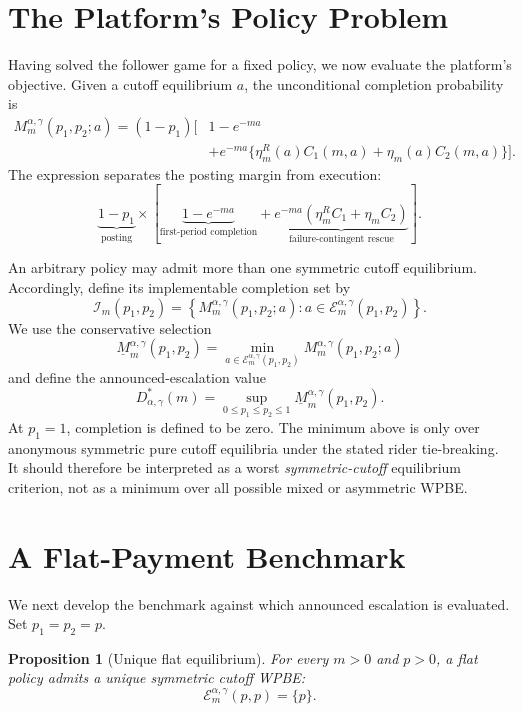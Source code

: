 \documentclass[11pt]{article}
\newtheorem{proposition}{Proposition}
\theoremstyle{definition}
\theoremstyle{remark}
\newcommand{\calE}{\mathcal E}
\newcommand{\calI}{\mathcal I}
\begin{document}
\section{The Platform's Policy Problem}
\label{sec:platform}

Having solved the follower game for a fixed policy, we now evaluate the
platform's objective.  Given a cutoff equilibrium \(a\), the unconditional
completion probability is
\[
\begin{aligned}
M_m^{\alpha,\gamma}(p_1,p_2;a)
=(1-p_1)\Big[
&1-e^{-ma}\\
&+e^{-ma}\{
\eta_m^R(a)C_1(m,a)+\eta_m(a)C_2(m,a)
\}
\Big].
\end{aligned}
\]
The expression separates the posting margin from execution:
\[
\underbrace{1-p_1}_{\text{posting}}
\times
\left[
\underbrace{1-e^{-ma}}_{\text{first-period completion}}
+
\underbrace{e^{-ma}(\eta_m^R C_1+\eta_m C_2)}
_{\text{failure-contingent rescue}}
\right].
\]

An arbitrary policy may admit more than one symmetric cutoff equilibrium.
Accordingly, define its implementable completion set by
\[
  \calI_m(p_1,p_2)
  =
  \left\{
  M_m^{\alpha,\gamma}(p_1,p_2;a):
  a\in\calE_m^{\alpha,\gamma}(p_1,p_2)
  \right\}.
\]
We use the conservative selection
\[
  \underline M_m^{\alpha,\gamma}(p_1,p_2)
  =
  \min_{a\in\calE_m^{\alpha,\gamma}(p_1,p_2)}
  M_m^{\alpha,\gamma}(p_1,p_2;a)
\]
and define the announced-escalation value
\[
  D_{\alpha,\gamma}^*(m)
  =
  \sup_{0\le p_1\le p_2\le1}
  \underline M_m^{\alpha,\gamma}(p_1,p_2).
\]
At \(p_1=1\), completion is defined to be zero.  The minimum above is only
over anonymous symmetric pure cutoff equilibria under the stated rider
tie-breaking.  It should therefore be interpreted as a worst
\emph{symmetric-cutoff} equilibrium criterion, not as a minimum over all
possible mixed or asymmetric WPBE.

\section{A Flat-Payment Benchmark}
\label{sec:flat}

We next develop the benchmark against which announced escalation is evaluated.
Set \(p_1=p_2=p\).

\begin{proposition}[Unique flat equilibrium]
\label{prop:flat}
For every \(m>0\) and \(p>0\), a flat policy admits a unique symmetric cutoff
WPBE:
\[
  \calE_m^{\alpha,\gamma}(p,p)=\{p\}.
\]
\end{proposition}
\end{document}
